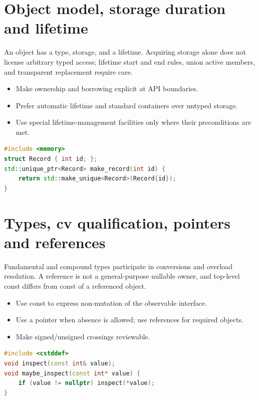 \documentclass[11pt]{article}
\begin{document}
\section{Object model, storage duration and lifetime}
An object has a type, storage, and a lifetime. Acquiring storage alone does not license arbitrary typed access; lifetime start and end rules, union active members, and transparent replacement require care.

\begin{itemize}[leftmargin=*,itemsep=1pt,topsep=3pt]
\item Make ownership and borrowing explicit at API boundaries.
\item Prefer automatic lifetime and standard containers over untyped storage.
\item Use special lifetime-management facilities only where their preconditions are met.
\end{itemize}
\begin{lstlisting}[language=C++]
#include <memory>
struct Record { int id; };
std::unique_ptr<Record> make_record(int id) {
    return std::make_unique<Record>(Record{id});
}
\end{lstlisting}
\section{Types, cv qualification, pointers and references}
Fundamental and compound types participate in conversions and overload resolution. A reference is not a general-purpose nullable owner, and top-level const differs from const of a referenced object.

\begin{itemize}[leftmargin=*,itemsep=1pt,topsep=3pt]
\item Use const to express non-mutation of the observable interface.
\item Use a pointer when absence is allowed; use references for required objects.
\item Make signed/unsigned crossings reviewable.
\end{itemize}
\begin{lstlisting}[language=C++]
#include <cstddef>
void inspect(const int& value);
void maybe_inspect(const int* value) {
    if (value != nullptr) inspect(*value);
}
\end{lstlisting}
\end{document}
